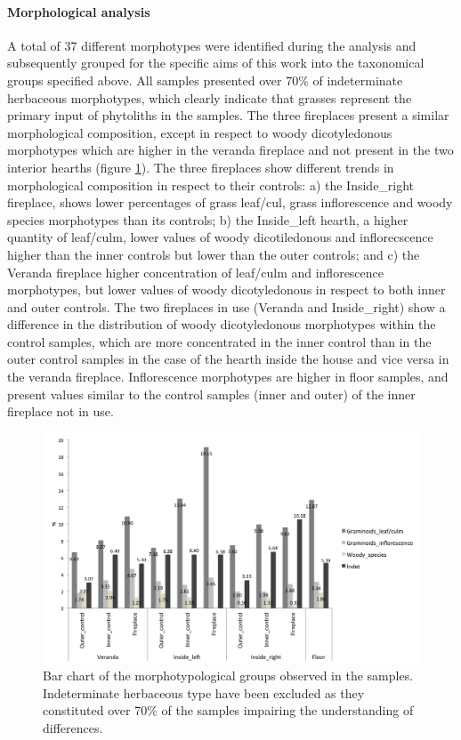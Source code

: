 \documentclass[authoryear,preprint,review,12pt]{elsarticle}
\begin{document}
\paragraph{Morphological analysis}
A total of 37 different morphotypes were identified during the analysis and subsequently grouped for the specific aims of this work into the taxonomical groups specified above. All samples presented over 70\% of indeterminate herbaceous morphotypes, which clearly indicate that grasses represent the primary input of phytoliths in the samples. The three fireplaces present a similar morphological composition, except in respect to woody dicotyledonous morphotypes which are higher in the veranda fireplace and not present in the two interior hearths (figure \ref{fig:morpho}). The three fireplaces show different trends in morphological composition in respect to their controls: a) the Inside\_right fireplace, shows lower percentages of grass leaf/cul, grass inflorescence and woody species morphotypes than its controls; b) the Inside\_left hearth, a higher quantity of leaf/culm, lower values of woody dicotiledonous and inflorecscence higher than the inner controls but lower than the outer controls; and c) the Veranda fireplace higher concentration of leaf/culm and inflorescence morphotypes, but lower values of woody dicotyledonous in respect to both inner and outer controls. The two fireplaces in use (Veranda and Inside\_right) show a difference in the distribution of woody dicotyledonous morphotypes within the control samples, which are more concentrated in the inner control than in the outer control samples in the case of the hearth inside the house and vice versa in the veranda fireplace. Inflorescence morphotypes are higher in floor samples, and present values similar to the control samples (inner and outer) of the inner fireplace not in use.

\begin{figure}[ht!]
  \begin{center}
    \includegraphics[width=15cm]{figures/fp_bar}
    \caption{Bar chart of the morphotypological groups observed in the samples. Indeterminate herbaceous type have been excluded as they constituted over 70\% of the samples impairing the understanding of differences.}
    \label{fig:morpho}
  \end{center}
\end{figure}
\end{document}
